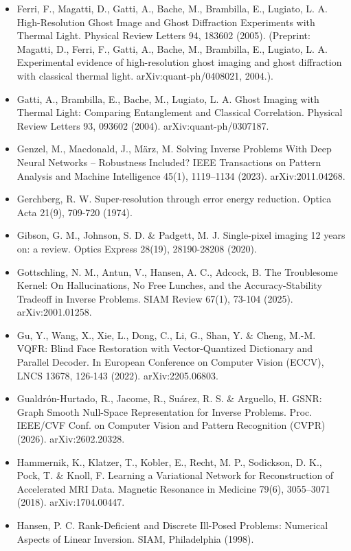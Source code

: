 \documentclass[11pt]{article}
\begin{document}
\begin{itemize}
\item Ferri, F., Magatti, D., Gatti, A., Bache, M., Brambilla, E., Lugiato, L. A. High-Resolution Ghost Image and Ghost Diffraction Experiments with Thermal Light. Physical Review Letters 94, 183602 (2005). (Preprint: Magatti, D., Ferri, F., Gatti, A., Bache, M., Brambilla, E., Lugiato, L. A. Experimental evidence of high-resolution ghost imaging and ghost diffraction with classical thermal light. arXiv:quant-ph/0408021, 2004.).
\item Gatti, A., Brambilla, E., Bache, M., Lugiato, L. A. Ghost Imaging with Thermal Light: Comparing Entanglement and Classical Correlation. Physical Review Letters 93, 093602 (2004). arXiv:quant-ph/0307187.
\item Genzel, M., Macdonald, J., März, M. Solving Inverse Problems With Deep Neural Networks -- Robustness Included? IEEE Transactions on Pattern Analysis and Machine Intelligence 45(1), 1119--1134 (2023). arXiv:2011.04268.
\item Gerchberg, R. W. Super-resolution through error energy reduction. Optica Acta 21(9), 709-720 (1974).
\item Gibson, G. M., Johnson, S. D. \& Padgett, M. J. Single-pixel imaging 12 years on: a review. Optics Express 28(19), 28190-28208 (2020).
\item Gottschling, N. M., Antun, V., Hansen, A. C., Adcock, B. The Troublesome Kernel: On Hallucinations, No Free Lunches, and the Accuracy-Stability Tradeoff in Inverse Problems. SIAM Review 67(1), 73-104 (2025). arXiv:2001.01258.
\item Gu, Y., Wang, X., Xie, L., Dong, C., Li, G., Shan, Y. \& Cheng, M.-M. VQFR: Blind Face Restoration with Vector-Quantized Dictionary and Parallel Decoder. In European Conference on Computer Vision (ECCV), LNCS 13678, 126-143 (2022). arXiv:2205.06803.
\item Gualdrón-Hurtado, R., Jacome, R., Suárez, R. S. \& Arguello, H. GSNR: Graph Smooth Null-Space Representation for Inverse Problems. Proc. IEEE/CVF Conf. on Computer Vision and Pattern Recognition (CVPR) (2026). arXiv:2602.20328.
\item Hammernik, K., Klatzer, T., Kobler, E., Recht, M. P., Sodickson, D. K., Pock, T. \& Knoll, F. Learning a Variational Network for Reconstruction of Accelerated MRI Data. Magnetic Resonance in Medicine 79(6), 3055--3071 (2018). arXiv:1704.00447.
\item Hansen, P. C. Rank-Deficient and Discrete Ill-Posed Problems: Numerical Aspects of Linear Inversion. SIAM, Philadelphia (1998).

\end{itemize}
\end{document}
